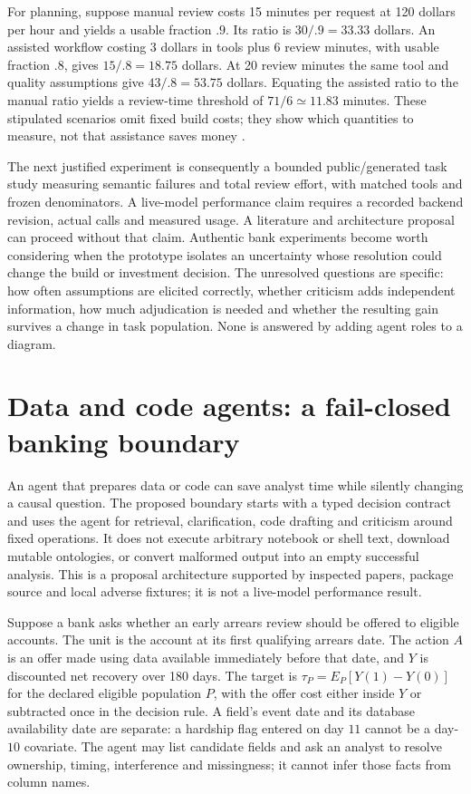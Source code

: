 For planning, suppose manual review costs 15 minutes per request at 120 dollars
per hour and yields a usable fraction $.9$. Its ratio is $30/.9=33.33$ dollars.
An assisted workflow costing 3 dollars in tools plus 6 review minutes, with
usable fraction $.8$, gives $15/.8=18.75$ dollars. At 20 review minutes the
same tool and quality assumptions give $43/.8=53.75$ dollars. Equating the
assisted ratio to the manual ratio yields a review-time threshold of
$71/6\simeq11.83$ minutes. These stipulated scenarios omit fixed build costs;
they show which quantities to measure, not that assistance saves money
\citep{exec13_architecture_exact}.

The next justified experiment is consequently a bounded public/generated task
study measuring semantic failures and total review effort, with matched tools
and frozen denominators. A live-model performance claim requires a recorded
backend revision, actual calls and measured usage. A literature and architecture
proposal can proceed without that claim. Authentic bank experiments become
worth considering when the prototype isolates an uncertainty whose resolution
could change the build or investment decision. The unresolved questions are
specific: how often assumptions are elicited correctly, whether criticism adds
independent information, how much adjudication is needed and whether the
resulting gain survives a change in task population. None is answered by adding
agent roles to a diagram.
\label{exec13:agent-architecture-end}


\section{Data and code agents: a fail-closed banking boundary}
\label{exec13:data-code-agents}

An agent that prepares data or code can save analyst time while silently changing a causal question. The proposed boundary starts with a typed decision contract and uses the agent for retrieval, clarification, code drafting and criticism around fixed operations. It does not execute arbitrary notebook or shell text, download mutable ontologies, or convert malformed output into an empty successful analysis. This is a proposal architecture supported by inspected papers, package source and local adverse fixtures; it is not a live-model performance result.

Suppose a bank asks whether an early arrears review should be offered to eligible accounts. The unit is the account at its first qualifying arrears date. The action $A$ is an offer made using data available immediately before that date, and $Y$ is discounted net recovery over 180 days. The target is $\tau_P=E_P[Y(1)-Y(0)]$ for the declared eligible population $P$, with the offer cost either inside $Y$ or subtracted once in the decision rule. A field's event date and its database availability date are separate: a hardship flag entered on day $11$ cannot be a day-$10$ covariate. The agent may list candidate fields and ask an analyst to resolve ownership, timing, interference and missingness; it cannot infer those facts from column names.

